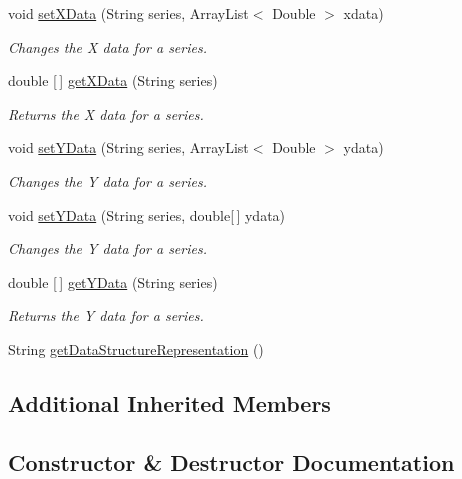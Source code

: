 \begin{DoxyCompactItemize}
void \mbox{\hyperlink{classbridges_1_1base_1_1_line_chart_a2f141ec46fdafd92fb0d86900a2de46a}{set\+X\+Data}} (String series, Array\+List$<$ Double $>$ xdata)
\begin{DoxyCompactList}\small\item\em Changes the X data for a series. \end{DoxyCompactList}\item 
double \mbox{[}$\,$\mbox{]} \mbox{\hyperlink{classbridges_1_1base_1_1_line_chart_a34ef6ace0633d287a78d0e224f38f2ed}{get\+X\+Data}} (String series)
\begin{DoxyCompactList}\small\item\em Returns the X data for a series. \end{DoxyCompactList}\item 
void \mbox{\hyperlink{classbridges_1_1base_1_1_line_chart_a3076dc99debb599529169de40815aba2}{set\+Y\+Data}} (String series, Array\+List$<$ Double $>$ ydata)
\begin{DoxyCompactList}\small\item\em Changes the Y data for a series. \end{DoxyCompactList}\item 
void \mbox{\hyperlink{classbridges_1_1base_1_1_line_chart_aa8094fad197ae35d93f9feab5de91f59}{set\+Y\+Data}} (String series, double\mbox{[}$\,$\mbox{]} ydata)
\begin{DoxyCompactList}\small\item\em Changes the Y data for a series. \end{DoxyCompactList}\item 
double \mbox{[}$\,$\mbox{]} \mbox{\hyperlink{classbridges_1_1base_1_1_line_chart_a2bf257f45c1056808b41581af1f83645}{get\+Y\+Data}} (String series)
\begin{DoxyCompactList}\small\item\em Returns the Y data for a series. \end{DoxyCompactList}\item 
String \mbox{\hyperlink{classbridges_1_1base_1_1_line_chart_a1d481880dc94fc8c2dfdcf64d2de2a3b}{get\+Data\+Structure\+Representation}} ()
\end{DoxyCompactItemize}
\subsection*{Additional Inherited Members}


\subsection{Constructor \& Destructor Documentation}
\mbox{\label{classbridges_1_1base_1_1_line_chart_ae864fe5ae85e80ae2f035471fb216e68}} 

